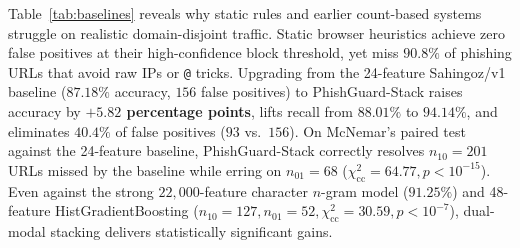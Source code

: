 \documentclass[conference]{IEEEtran}
\begin{document}
Table~\ref{tab:baselines} reveals why static rules and earlier count-based systems struggle on realistic domain-disjoint traffic. Static browser heuristics achieve zero false positives at their high-confidence block threshold, yet miss $90.8\%$ of phishing URLs that avoid raw IPs or \texttt{@} tricks. Upgrading from the 24-feature Sahingoz/v1 baseline ($87.18\%$ accuracy, $156$ false positives) to PhishGuard-Stack raises accuracy by \textbf{$+5.82$ percentage points}, lifts recall from $88.01\%$ to $94.14\%$, and eliminates $40.4\%$ of false positives ($93$ vs.\ $156$). On McNemar's paired test against the 24-feature baseline, PhishGuard-Stack correctly resolves $n_{10}=201$ URLs missed by the baseline while erring on $n_{01}=68$ ($\chi^2_{\text{cc}}=64.77, p < 10^{-15}$). Even against the strong $22{,}000$-feature character $n$-gram model ($91.25\%$) and 48-feature HistGradientBoosting ($n_{10}=127, n_{01}=52, \chi^2_{\text{cc}}=30.59, p < 10^{-7}$), dual-modal stacking delivers statistically significant gains.
\end{document}
